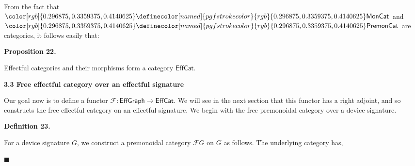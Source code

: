\documentclass[10pt,a4paper]{article}
\begin{document}
 
 
 
From the fact that ${\color[rgb]{0.296875,0.3359375,0.4140625}\definecolor[named]{pgfstrokecolor}{rgb}{0.296875,0.3359375,0.4140625}\mathsf{MonCat}}$ and ${\color[rgb]{0.296875,0.3359375,0.4140625}\definecolor[named]{pgfstrokecolor}{rgb}{0.296875,0.3359375,0.4140625}\mathsf{PremonCat}}$ are categories, it follows easily that:\par
 
 
 
\par\medskip\noindent\textbf{Proposition 22.}\par
 
 
Effectful categories and their morphisms form a category $\mathsf{EffCat}$.\par
 
 
 
 
 
\par\medskip\noindent\textbf{3.3 Free effectful category over an effectful signature}\par
 
 
Our goal now is to define a functor $\mathscr{F}{}:\mathsf{EffGraph}\to\mathsf{EffCat}$. We will see in the next section that this functor has a right adjoint, and so constructs the free effectful category on an effectful signature. We begin with the free premonoidal category over a device signature.\par
 
 
 
\par\medskip\noindent\textbf{Definition 23.}\par
 
 
For a device signature $G$, we construct a premonoidal category $\mathcal{F}G$ on $G$ as follows. The underlying category has,\par
  
\par\noindent  $\blacksquare$ 
 
\end{document}
